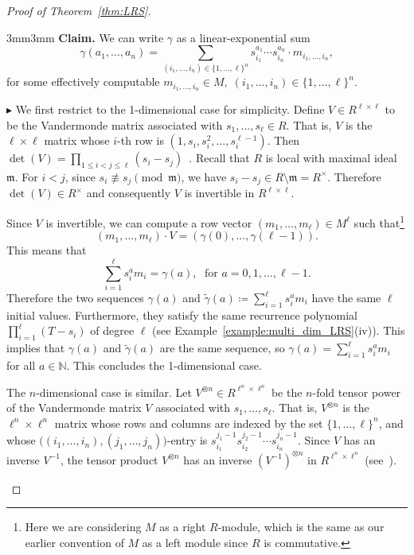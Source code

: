 \documentclass[letterpaper, 11pt, thm-restate]{article}
\numberwithin{equation}{section}
\newcommand{\N}{\mathbb{N}}
\newcommand{\frm}{\mathfrak{m}}
\theoremstyle{definition}
\theoremstyle{definition}
\theoremstyle{definition}
\begin{document}
\begin{proof}[Proof of Theorem~\ref{thm:LRS}]
    \medskip
    \begin{adjustwidth}{3mm}{3mm}
    \textbf{Claim.} We can write $\gamma$ as a linear-exponential sum 
    \begin{equation}\label{eq:alpha_lin_exp}
    \gamma(a_1, \ldots, a_n) = \sum_{(i_1, \ldots, i_n) \in \{1, \ldots, \ell\}^n} s_{i_1}^{a_1} \cdots s_{i_n}^{a_n} \cdot m_{i_1, \ldots, i_n},
    \end{equation}
    for some effectively computable $m_{i_1, \ldots, i_n} \in M,\; (i_1, \ldots, i_n) \in \{1, \ldots, \ell\}^n$.
    \medskip
    
    \noindent$\blacktriangleright$
    We first restrict to the 1-dimensional case for simplicity.
    Define $V \in R^{\ell \times \ell}$ to be the Vandermonde matrix associated with $s_1,\ldots,s_{\ell} \in R$.
    That is, $V$ is the $\ell \times \ell$ matrix whose $i$-th row is $(1,s_i,s_i^2,\ldots, s_i^{\ell-1})$.
    Then $\det(V)=\prod_{1\leq i<j \leq \ell}(s_i-s_j)$~\cite[Section~0.9.11]{horn2012matrix}. 
    Recall that $R$ is local with maximal ideal $\frm$.
    For $i < j$, since $s_i \not\equiv s_j \pmod{\frm}$, we have $s_i - s_j \in R \setminus \frm = R^{\times}$.
    Therefore $\det(V) \in R^{\times}$ and consequently $V$ is invertible in $R^{\ell \times \ell}$.

    Since $V$ is invertible, we can compute a row vector $(m_1, \ldots, m_{\ell}) \in M^{\ell}$ such that\footnote{Here we are considering $M$ as a right $R$-module, which is the same as our earlier convention of $M$ as a left module since $R$ is commutative.}
    \[
    (m_1, \ldots, m_{\ell} ) \cdot V = (\gamma(0),...,\gamma(\ell-1) ).
    \]
    This means that
    \[
    \textstyle
    \sum_{i=1}^{\ell}s_i^a m_i = \gamma(a),\; \text{ for } a = 0, 1, \ldots, \ell-1.
    \]
    Therefore the two sequences $\gamma(a)$ and $\tilde \gamma(a) \coloneqq \sum_{i=1}^{\ell}s_i^a m_i$ have the same $\ell$ initial values.
    Furthermore, they satisfy the same recurrence polynomial $\prod_{i=1}^{\ell} (T-s_i)$ of degree $\ell$ (see Example~\ref{example:multi_dim_LRS}(iv)).
    This implies that $\gamma(a)$ and $\tilde \gamma(a)$ are the same sequence, so $\gamma(a)=\sum_{i=1}^{\ell}s_i^a m_i$ for all $a \in \N$.
    This concludes the 1-dimensional case.
    
    The $n$-dimensional case is similar. 
    Let $V^{\otimes n} \in R^{\ell^n \times \ell^n}$ be the $n$-fold tensor power of the Vandermonde matrix $V$ associated with $s_1,\ldots,s_{\ell}$.
    That is, $V^{\otimes n}$ is the $\ell^n \times \ell^n$ matrix whose rows and columns are indexed by the set $\{1, \ldots, \ell\}^n$, and whose $\big((i_1, \ldots, i_n), (j_1, \ldots, j_n)\Big)$-entry is $s_{i_1}^{j_1-1} s_{i_2}^{j_2-1} \cdots s_{i_n}^{j_n-1}$.
    Since $V$ has an inverse $V^{-1}$, the tensor product $V^{\otimes n}$ has an inverse $(V^{-1})^{\otimes n}$ in $R^{\ell^n \times \ell^n}$ (see~\cite[p.408]{LancasterTismenetsky1985}).


\end{adjustwidth}
\end{proof}
\end{document}
